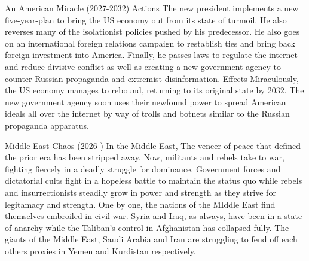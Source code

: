    An American Miracle (2027-2032)
        Actions
            The new president implements a new five-year-plan to bring the US economy out from its state of turmoil. He also reverses many of the isolationist policies pushed by his predecessor. He also goes on an international foreign relations campaign to restablish ties and bring back foreign investment into America. Finally, he passes laws to regulate the internet and reduce divisive conflict as well as creating a new government agency to counter Russian propaganda and extremist disinformation.
        Effects
            Miraculously, the US economy manages to rebound, returning to its original state by 2032.
            The new government agency soon uses their newfound power to spread American ideals all over the internet by way of trolls and botnets similar to the Russian propaganda apparatus.
        
    Middle East Chaos (2026-)
        In the Middle East, The veneer of peace that defined the prior era has been stripped away. Now, militants and rebels take to war, fighting fiercely in a deadly struggle for dominance. Government forces and dictatorial cults fight in a hopeless battle to maintain the status quo while rebels and insurrectionists steadily grow in power and strength as they strive for legitamacy and strength. One by one, the nations of the MIddle East find themselves embroiled in civil war. Syria and Iraq, as always, have been in a state of anarchy while the Taliban's control in Afghanistan has collapsed fully. The giants of the Middle East, Saudi Arabia and Iran are struggling to fend off each others proxies in Yemen and Kurdistan respectively.
    

